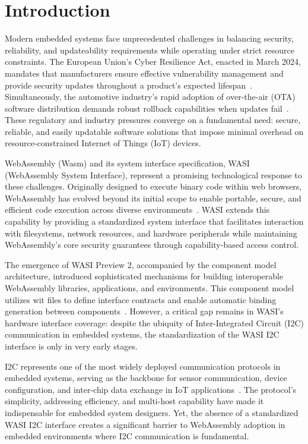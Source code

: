 \chapter{Introduction}
\label{chap:introduction}

Modern embedded systems face unprecedented challenges in balancing security, reliability, and updateability requirements while operating under strict resource constraints. The European Union's Cyber Resilience Act, enacted in March 2024, mandates that manufacturers ensure effective vulnerability management and provide security updates throughout a product's expected lifespan~\cite{eu_cyber_res_act}. Simultaneously, the automotive industry's rapid adoption of over-the-air (OTA) software distribution demands robust rollback capabilities when updates fail~\cite{automotive_ota}. These regulatory and industry pressures converge on a fundamental need: secure, reliable, and easily updatable software solutions that impose minimal overhead on resource-constrained Internet of Things (IoT) devices.

WebAssembly (Wasm) and its system interface specification, WASI (WebAssembly System Interface), represent a promising technological response to these challenges. Originally designed to execute binary code within web browsers, WebAssembly has evolved beyond its initial scope to enable portable, secure, and efficient code execution across diverse environments~\cite{wasm_spec}. WASI extends this capability by providing a standardized system interface that facilitates interaction with filesystems, network resources, and hardware peripherals while maintaining WebAssembly's core security guarantees through capability-based access control.

The emergence of WASI Preview 2, accompanied by the component model architecture, introduced sophisticated mechanisms for building interoperable WebAssembly libraries, applications, and environments. This component model utilizes \acrfull{wit} files to define interface contracts and enable automatic binding generation between components~\cite{wasi_p2}. However, a critical gap remains in WASI's hardware interface coverage: despite the ubiquity of Inter-Integrated Circuit (I2C) communication in embedded systems, the standardization of the WASI I2C interface is only in very early stages.

I2C represents one of the most widely deployed communication protocols in embedded systems, serving as the backbone for sensor communication, device configuration, and inter-chip data exchange in IoT applications~\cite{i2c_specification}. The protocol's simplicity, addressing efficiency, and multi-host capability have made it indispensable for embedded system designers. Yet, the absence of a standardized WASI I2C interface creates a significant barrier to WebAssembly adoption in embedded environments where I2C communication is fundamental.




